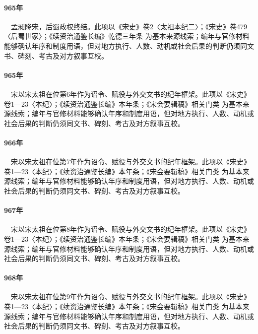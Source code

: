 \paragraph{965年}　孟昶降宋，后蜀政权终结。此项以《宋史》卷2〈太祖本纪二〉；《宋史》卷479〈后蜀世家〉；《续资治通鉴长编》乾德三年条 为基本来源线索；编年与官修材料能够确认年序和制度用语，但对地方执行、人数、动机或社会后果的判断仍须同文书、碑刻、考古及对方叙事互校。

\paragraph{965年}　宋以宋太祖在位第6年作为诏令、赋役与外交文书的纪年框架。此项以《宋史》卷1—23〈本纪〉；《续资治通鉴长编》本年条；《宋会要辑稿》相关门类 为基本来源线索；编年与官修材料能够确认年序和制度用语，但对地方执行、人数、动机或社会后果的判断仍须同文书、碑刻、考古及对方叙事互校。

\paragraph{966年}　宋以宋太祖在位第7年作为诏令、赋役与外交文书的纪年框架。此项以《宋史》卷1—23〈本纪〉；《续资治通鉴长编》本年条；《宋会要辑稿》相关门类 为基本来源线索；编年与官修材料能够确认年序和制度用语，但对地方执行、人数、动机或社会后果的判断仍须同文书、碑刻、考古及对方叙事互校。

\paragraph{967年}　宋以宋太祖在位第8年作为诏令、赋役与外交文书的纪年框架。此项以《宋史》卷1—23〈本纪〉；《续资治通鉴长编》本年条；《宋会要辑稿》相关门类 为基本来源线索；编年与官修材料能够确认年序和制度用语，但对地方执行、人数、动机或社会后果的判断仍须同文书、碑刻、考古及对方叙事互校。

\paragraph{968年}　宋以宋太祖在位第9年作为诏令、赋役与外交文书的纪年框架。此项以《宋史》卷1—23〈本纪〉；《续资治通鉴长编》本年条；《宋会要辑稿》相关门类 为基本来源线索；编年与官修材料能够确认年序和制度用语，但对地方执行、人数、动机或社会后果的判断仍须同文书、碑刻、考古及对方叙事互校。

